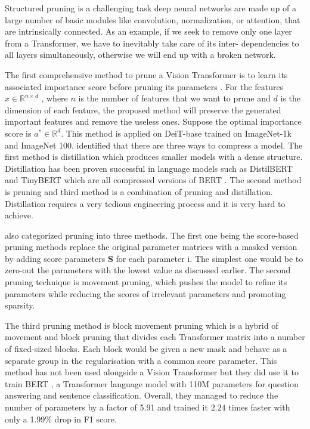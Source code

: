 Structured pruning is a challenging task deep neural networks are made up of a large number of basic modules like convolution, normalization, or attention, that are intrinsically connected. As an example, if we seek to remove only one layer from a Transformer, we have to inevitably take care of its inter-
dependencies to all layers simultaneously, otherwise we will end up with a broken network.

The first comprehensive method to prune a Vision Transformer is to learn its associated importance score before pruning its parameters \cite{pruning-vit}. For the features $x \in \mathbb{R}^{n \times d}$ , where $n$ is the number of features that we want to prune and $d$ is the dimension of each feature, the proposed method will preserve the generated important features and remove the useless ones. Suppose the optimal importance score is $a^* \in \mathbb{R}^d$. This method is applied on DeiT-base \cite{deit} trained on ImageNet-1k and ImageNet 100. 
 identified that there are three ways to compress a model. The first method is distillation which produces smaller models with a dense structure. Distillation has been proven successful in language models such as DistilBERT \cite{distilbert} and TinyBERT \cite{tinybert} which are all compressed versions of BERT \cite{bert}. The second method is pruning and third method is a combination of pruning and distillation. Distillation requires a very tedious engineering process and it is very hard to achieve.

 also categorized pruning into three methods. The first one being the score-based pruning methods \cite{score-pruning} replace the original parameter matrices with a masked version by adding score parameters \textbf{S} for each parameter i. The simplest one would be to zero-out the parameters with the lowest value as discussed earlier. The second pruning technique is movement pruning, which pushes the model to refine its parameters while reducing the scores of irrelevant parameters and promoting sparsity.

The third pruning method is block movement pruning \cite{pruning-block} which is a hybrid of movement and block pruning that divides each Transformer matrix into a number of fixed-sized blocks. Each block would be given a new mask and behave as a separate group in the regularisation with a common score parameter. This method has not been used alongside a Vision Transformer but they did use it to train BERT \cite{bert}, a Transformer language model with 110M parameters for question answering and sentence classification. Overall, they managed to reduce the number of parameters by a factor of 5.91 and trained it $2.24$ times faster with only a 1.99\% drop in F1 score.

